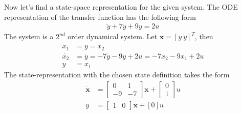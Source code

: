 \documentclass[twoside]{article}
\theoremstyle{definition}
\begin{document}
\vspace{12pt}

Now let's find a state-space representation for the given system. The
ODE representation of the transfer function has the following form
%
\begin{align*}
  \ddot{y} + 7 \dot{y} + 9 y = 2 u
\end{align*}
%
The system is a $2^{nd}$ order dynamical system. Let $\mathbf{x} = [y
\ \dot{y}]^T$, then 
%
\begin{align*}
  \dot{x_1} &= \dot{y} = x_2 \\
  \dot{x_2} &= \ddot{y} = -7 \dot{y} - 9 y + 2 u  
              = -7 x_2 - 9 x_1 +2 u  \\
  y &= x_1
\end{align*}
%
The state-representation with the chosen state definition takes the form
 \begin{align*}
\dot{\mathbf{x}} &= \left[ \begin{array}{cc} 0 & 1\\
-9 & -7 
\end{array} \right] \mathbf{x} +
\left[ \begin{array}{c} 0 \\ 1 \end{array} \right] u
\\
y &= \left[ \begin{array}{cccc} 1 & 0 \end{array} \right] \mathbf{x} 
+ [ 0 ] u
\end{align*}

\end{document}
